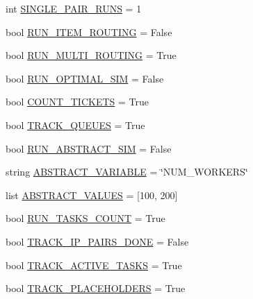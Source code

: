 \begin{DoxyCompactItemize}
\item 
int \mbox{\hyperlink{namespacedynamicfilterapp_1_1toggles_a70d4dc65db288020e23ca213cd97c0f8}{S\+I\+N\+G\+L\+E\+\_\+\+P\+A\+I\+R\+\_\+\+R\+U\+NS}} = 1
\item 
bool \mbox{\hyperlink{namespacedynamicfilterapp_1_1toggles_a41d76408f27c5889dc3f40f066583a9f}{R\+U\+N\+\_\+\+I\+T\+E\+M\+\_\+\+R\+O\+U\+T\+I\+NG}} = False
\item 
bool \mbox{\hyperlink{namespacedynamicfilterapp_1_1toggles_a5f084acb116f3a65b90532f6a2ecb81b}{R\+U\+N\+\_\+\+M\+U\+L\+T\+I\+\_\+\+R\+O\+U\+T\+I\+NG}} = True
\item 
bool \mbox{\hyperlink{namespacedynamicfilterapp_1_1toggles_a82ca5524da03a0787588ac48df06bb1a}{R\+U\+N\+\_\+\+O\+P\+T\+I\+M\+A\+L\+\_\+\+S\+IM}} = False
\item 
bool \mbox{\hyperlink{namespacedynamicfilterapp_1_1toggles_ac35fabae4c109189ac40e759f367ee79}{C\+O\+U\+N\+T\+\_\+\+T\+I\+C\+K\+E\+TS}} = True
\item 
bool \mbox{\hyperlink{namespacedynamicfilterapp_1_1toggles_a170d7dba5203e9b2ab89eb541ed83b3a}{T\+R\+A\+C\+K\+\_\+\+Q\+U\+E\+U\+ES}} = True
\item 
bool \mbox{\hyperlink{namespacedynamicfilterapp_1_1toggles_a73b7b22a82dc40407d03e22dca8ac257}{R\+U\+N\+\_\+\+A\+B\+S\+T\+R\+A\+C\+T\+\_\+\+S\+IM}} = False
\item 
string \mbox{\hyperlink{namespacedynamicfilterapp_1_1toggles_a05ba5c39ee5a05284597d091b01650a3}{A\+B\+S\+T\+R\+A\+C\+T\+\_\+\+V\+A\+R\+I\+A\+B\+LE}} = \char`\"{}N\+U\+M\+\_\+\+W\+O\+R\+K\+E\+RS\char`\"{}
\item 
list \mbox{\hyperlink{namespacedynamicfilterapp_1_1toggles_ab64c8432c11e4b89425ac1f220ca01a9}{A\+B\+S\+T\+R\+A\+C\+T\+\_\+\+V\+A\+L\+U\+ES}} = \mbox{[}100, 200\mbox{]}
\item 
bool \mbox{\hyperlink{namespacedynamicfilterapp_1_1toggles_a904bebe166c12146cac5f4dec979450c}{R\+U\+N\+\_\+\+T\+A\+S\+K\+S\+\_\+\+C\+O\+U\+NT}} = True
\item 
bool \mbox{\hyperlink{namespacedynamicfilterapp_1_1toggles_ac1bb03e2d3e1f9304e6628d802795547}{T\+R\+A\+C\+K\+\_\+\+I\+P\+\_\+\+P\+A\+I\+R\+S\+\_\+\+D\+O\+NE}} = False
\item 
bool \mbox{\hyperlink{namespacedynamicfilterapp_1_1toggles_a9c5fce243b39b491bbdf705555a92617}{T\+R\+A\+C\+K\+\_\+\+A\+C\+T\+I\+V\+E\+\_\+\+T\+A\+S\+KS}} = True
\item 
bool \mbox{\hyperlink{namespacedynamicfilterapp_1_1toggles_a2be074e9eca6d662578ca68c95050ad3}{T\+R\+A\+C\+K\+\_\+\+P\+L\+A\+C\+E\+H\+O\+L\+D\+E\+RS}} = True

\end{DoxyCompactItemize}
